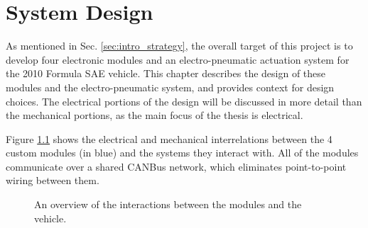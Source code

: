 \chapter{System Design\label{cha:design}}

As mentioned in Sec. \ref{sec:intro_strategy}, the overall target of this project is to develop four electronic modules and an electro-pneumatic actuation system for the 2010 Formula SAE vehicle. This chapter describes the design of these modules and the electro-pneumatic system, and provides context for design choices. The electrical portions of the design will be discussed in more detail than the mechanical portions, as the main focus of the thesis is electrical. 

Figure \ref{fig:design_overview} shows the electrical and mechanical interrelations between the 4 custom modules (in blue) and the systems they interact with. All of the modules communicate over a shared CANBus network, which eliminates point-to-point wiring between them.

\begin{figure}[H]
\centering

\caption{An overview of the interactions between the modules and the vehicle.}
\label{fig:design_overview}
\end{figure}






